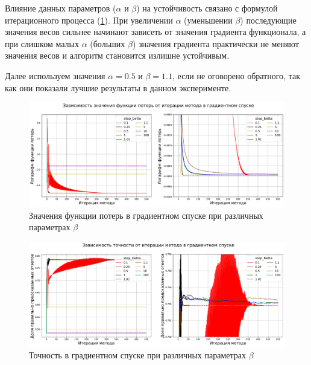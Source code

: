 \documentclass{article}
\begin{document}
\begin{itemize}
Влияние данных параметров ($\alpha$ и $\beta$) на устойчивость связано с формулой итерационного процесса (\hyperlink{formula}{1}). При увеличении $\alpha$ (уменьшении $\beta$) последующие значения весов сильнее начинают зависеть от значения градиента функционала, а при слишком малых $\alpha$ (больших $\beta$) значения градиента практически не меняют значения весов и алгоритм становится излишне устойчивым.

Далее используем значения $\alpha=0.5$ и $\beta=1.1$, если не оговорено обратного, так как они показали лучшие результаты в данном эксперименте.

\begin{figure}[H]
    \centering
    \includegraphics[width=15cm]{TASK2 step_betta loss.pdf}
    \caption{Значения функции потерь в градиентном спуске при различных параметрах $\beta$}
    \label{fig:step_betta_loss}
\end{figure}
\begin{figure}[H]
    \centering
    \includegraphics[width=15cm]{TASK2 step_betta accuracy.pdf}
    \caption{Точность в градиентном спуске при различных параметрах $\beta$}
    \label{fig:step_betta_accuracy}
\end{figure}


\end{itemize}
\end{document}
